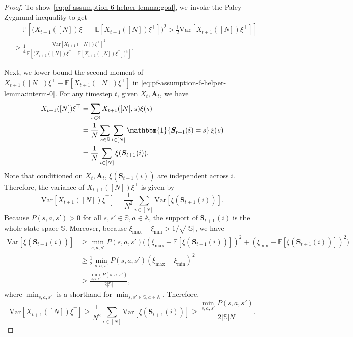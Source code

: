 \documentclass[11pt,letterpaper]{article}
\theoremstyle{plain}
\theoremstyle{definition}
\theoremstyle{remark}
\newcommand{\E}[1]{\mathbb{E}\left[#1\right]}
\newcommand{\Eplain}[1]{\mathbb{E}[#1]}
\newcommand{\Var}[1]{\text{Var}{\left[#1\right]}}
\newcommand{\Prob}[1]{\mathbb{P}\left[#1\right]}
\newcommand{\indibrac}[1]{\mathbbm{1}\!\left\{#1\right\}}
\newcommand{\ve}[1]{\bm{#1}}
\newcommand{\veS}{\ve{S}}
\newcommand{\veA}{\ve{A}}
\newcommand{\sspa}{\mathbb{S}}
\newcommand{\aspa}{\mathbb{A}}
\newcommand{\sumN}{\sum_{i\in[N]}}
\newcommand{\ximax}{\xi_{\max}}
\newcommand{\ximin}{\xi_{\min}}
\begin{document}
\begin{proof}
    To show \eqref{eq:pf-assumption-6-helper-lemma:goal}, we invoke the Paley-Zygmund inequality to get
    \begin{align}
        \nonumber
        &\mspace{23mu} \Prob{\big(X_{t+1}([N]) \xi^\top -\Eplain{X_{t+1}([N]) \xi^\top}\big)^2  > \frac{1}{2}\Var{X_{t+1}([N]) \xi^\top}} \\
        \label{eq:pf-assumption-6-helper-lemma:interm-0}
        &\geq \frac{1}{4} \frac{\Var{X_{t+1}([N]) \xi^\top}^2}{\E{\big(X_{t+1}([N]) \xi^\top -\Eplain{X_{t+1}([N]) \xi^\top}\big)^4}}.
    \end{align}
    
    Next, we lower bound the second moment of $X_{t+1}([N]) \xi^\top -\Eplain{X_{t+1}([N]) \xi^\top}$ in \eqref{eq:pf-assumption-6-helper-lemma:interm-0}.  
    For any timestep $t$, given $X_t, \veA_t$, we have
    \begin{align}
        X_{t+1}([N]) \xi^\top
        &= \sum_{s\in\sspa} X_{t+1}([N], s) \xi(s) \\
        &= \frac{1}{N} \sum_{s\in\sspa}  \sumN \indibrac{\veS_{t+1}(i) = s} \xi(s) \\
        &= \frac{1}{N} \sumN \xi(\veS_{t+1}(i)). 
    \end{align}
    Note that conditioned on $X_t, \veA_t$, $\xi(\veS_{t+1}(i))$ are independent across $i$. Therefore, the variance of $X_{t+1}([N]) \xi^\top$ is given by 
    \[
        \Var{X_{t+1}([N]) \xi^\top} = \frac{1}{N^2} \sumN \Var{\xi(\veS_{t+1}(i))}.
    \]
    Because $P(s,a,s') > 0$ for all $s,s'\in\sspa, a\in\aspa$, the support of $\veS_{t+1}(i)$ is the whole state space $\sspa$. Moreover, because $\ximax - \ximin > 1/\sqrt{|\sspa|}$, we have
    \begin{align*}
        \Var{\xi(\veS_{t+1}(i))} 
        &\geq \min_{s,a,s'} P(s,a,s') \Big( (\ximax - \E{\xi(\veS_{t+1}(i))})^2 + (\ximin - \E{\xi(\veS_{t+1}(i))})^2 \Big) \\
        &\geq \frac{1}{2} \min_{s,a,s'} P(s,a,s')  (\ximax - \ximin)^2 \\
        &\geq \frac{\min_{s,a,s'} P(s,a,s')}{2|\sspa|},
    \end{align*}
    where $\min_{s,a,s'}$ is a shorthand for $\min_{s,s'\in\sspa, a\in\aspa}$. 
    Therefore, 
    \begin{equation}
        \label{eq:pf-assumption-6-helper-lemma:interm-1}
        \Var{X_{t+1}([N]) \xi^\top} \geq \frac{1}{N^2} \sumN \Var{\xi(\veS_{t+1}(i))} \geq \frac{\min_{s,a,s'} P(s,a,s')}{2|\sspa|N}.
    \end{equation}


\end{proof}
\end{document}

